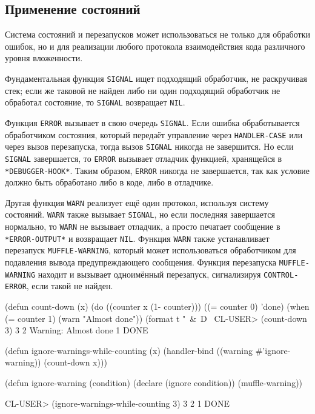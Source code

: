 \subsection{Применение состояний}
Система состояний и перезапусков может использоваться не только для обработки ошибок, но и для реализации любого протокола взаимодействия кода различного уровня вложенности.

Фундаментальная функция \lstinline{SIGNAL} ищет подходящий обработчик, не раскручивая стек; если же таковой не найден либо ни один подходящий обработчик не обработал состояние, то \lstinline{SIGNAL} возвращает \lstinline{NIL}.

Функция \lstinline{ERROR} вызывает в свою очередь \lstinline{SIGNAL}. Если ошибка обработывается обработчиком состояния, который передаёт управление через \lstinline{HANDLER-CASE} или через вызов перезапуска, тогда вызов \lstinline{SIGNAL} никогда не завершится. Но если \lstinline{SIGNAL} завершается, то \lstinline{ERROR} вызывает отладчик функцией, хранящейся в \lstinline{*DEBUGGER-HOOK*}. Таким образом, \lstinline{ERROR} никогда не завершается, так как условие должно быть обработано либо в коде, либо в отладчике.

Другая функция \lstinline{WARN} реализует ещё один протокол, используя систему состояний. \lstinline{WARN} также вызывает \lstinline{SIGNAL}, но если последняя завершается нормально, то \lstinline{WARN} не вызывает отладчик, а просто печатает сообщение в \lstinline{*ERROR-OUTPUT*} и возвращает \lstinline{NIL}. Функция \lstinline{WARN} также устанавливает перезапуск \lstinline{MUFFLE-WARNING}, который может использоваться обработчиком для подавления вывода предупреждающего сообщения. Функция перезапуска \lstinline{MUFFLE-WARNING} находит и вызывает одноимённый перезапуск, сигнализируя \lstinline{CONTROL-ERROR}, если такой не найден.
\begin{cllst}{}{}
(defun count-down (x)
  (do ((counter x (1- counter)))
      ((= counter 0) 'done)
    (when (= counter 1)
      (warn "Almost done"))
    (format t "~&~D~%
CL-USER> (count-down 3)
3
2
Warning: Almost done
1
DONE

(defun ignore-warnings-while-counting (x)
  (handler-bind ((warning #'ignore-warning))
    (count-down x)))

(defun ignore-warning (condition)
  (declare (ignore condition))
  (muffle-warning))

CL-USER> (ignore-warnings-while-counting 3)
3
2
1
DONE
\end{cllst}

